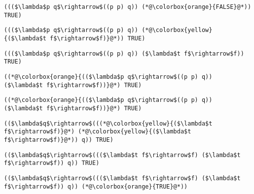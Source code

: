\documentclass{beamer}
\begin{document}
\begin{frame}[fragile]{\CurrentSection}
\lstset{basicstyle=\ttfamily\small}\lstset{numbers=none}\lstset{language=ML}\begin{lstlisting}
((($\lambda$p q$\rightarrow$((p p) q)) (*@\colorbox{orange}{FALSE}@*)) TRUE)
\end{lstlisting}
\pause\lstset{language=ML}\begin{lstlisting}
((($\lambda$p q$\rightarrow$((p p) q)) (*@\colorbox{yellow}{($\lambda$t f$\rightarrow$f)}@*)) TRUE)
\end{lstlisting}

\end{frame}

\begin{frame}[fragile]{\CurrentSection}
\lstset{basicstyle=\ttfamily\small}\lstset{numbers=none}\lstset{language=ML}\begin{lstlisting}
((($\lambda$p q$\rightarrow$((p p) q)) ($\lambda$t f$\rightarrow$f)) TRUE)
\end{lstlisting}
\pause\lstset{language=ML}\begin{lstlisting}
((*@\colorbox{orange}{(($\lambda$p q$\rightarrow$((p p) q)) ($\lambda$t f$\rightarrow$f))}@*) TRUE)
\end{lstlisting}

\end{frame}

\begin{frame}[fragile]{\CurrentSection}
\lstset{basicstyle=\ttfamily\small}\lstset{numbers=none}\lstset{language=ML}\begin{lstlisting}
((*@\colorbox{orange}{(($\lambda$p q$\rightarrow$((p p) q)) ($\lambda$t f$\rightarrow$f))}@*) TRUE)
\end{lstlisting}
\pause\lstset{language=ML}\begin{lstlisting}
(($\lambda$q$\rightarrow$(((*@\colorbox{yellow}{($\lambda$t f$\rightarrow$f)}@*) (*@\colorbox{yellow}{($\lambda$t f$\rightarrow$f)}@*)) q)) TRUE)
\end{lstlisting}

\end{frame}

\begin{frame}[fragile]{\CurrentSection}
\lstset{basicstyle=\ttfamily\small}\lstset{numbers=none}\lstset{language=ML}\begin{lstlisting}
(($\lambda$q$\rightarrow$((($\lambda$t f$\rightarrow$f) ($\lambda$t f$\rightarrow$f)) q)) TRUE)
\end{lstlisting}
\pause\lstset{language=ML}\begin{lstlisting}
(($\lambda$q$\rightarrow$((($\lambda$t f$\rightarrow$f) ($\lambda$t f$\rightarrow$f)) q)) (*@\colorbox{orange}{TRUE}@*))
\end{lstlisting}

\end{frame}
\end{document}
